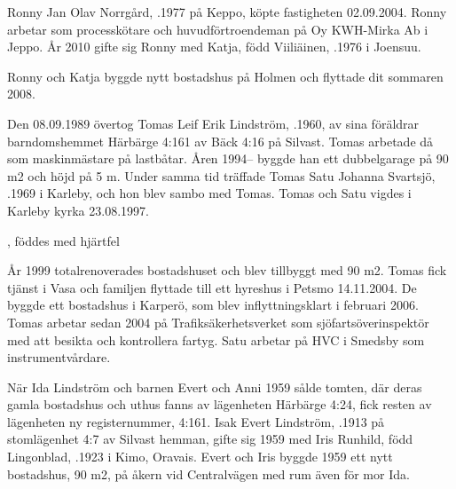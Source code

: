 Ronny Jan Olav Norrgård, .1977 på Keppo, köpte	fastigheten 02.09.2004. Ronny arbetar som processkötare och huvudförtroendeman på Oy KWH-Mirka Ab i Jeppo. År 2010 gifte sig Ronny med Katja, född Viiliäinen, .1976 i Joensuu.
\begin{jhchildren}
  \item {}
  \item {}
  \item {}
\end{jhchildren}
Ronny och Katja byggde nytt bostadshus på Holmen och flyttade dit sommaren 2008.


Den 08.09.1989 övertog Tomas Leif Erik Lindström, .1960, av sina föräldrar barndomshemmet Härbärge 4:161 av Bäck 4:16 på Silvast. Tomas arbetade då som maskinmästare på lastbåtar. Åren 1994-- byggde han ett dubbelgarage på 90 m2 och höjd på 5 m. Under samma tid träffade Tomas Satu Johanna Svartsjö, .1969 i Karleby, och 	hon blev sambo med Tomas. Tomas och Satu vigdes i Karleby kyrka 23.08.1997.
\begin{jhchildren}
  \item {}, föddes med hjärtfel
  \item {}
  \item {}
  \item {}
\end{jhchildren}
År 1999 totalrenoverades bostadshuset och blev tillbyggt med 90 m2.	Tomas fick tjänst i Vasa och familjen flyttade till ett hyreshus i Petsmo 14.11.2004. De byggde ett bostadshus i Karperö, som blev inflyttningsklart i februari 2006. Tomas arbetar sedan 2004 på Trafiksäkerhetsverket som sjöfartsöverinspektör med att besikta och kontrollera fartyg. Satu arbetar på HVC i Smedsby som instrumentvårdare.


När Ida Lindström och barnen Evert och Anni 1959 sålde tomten, där deras gamla bostadshus och uthus fanns av lägenheten Härbärge 4:24, fick resten av lägenheten ny registernummer, 4:161. Isak Evert Lindström, .1913 på stomlägenhet 4:7 av Silvast hemman, gifte sig 1959 med Iris Runhild, född Lingonblad, .1923 i Kimo, 	Oravais. Evert och Iris byggde 1959 ett nytt bostadshus, 90 m2, på åkern vid Centralvägen med rum även för mor Ida.

